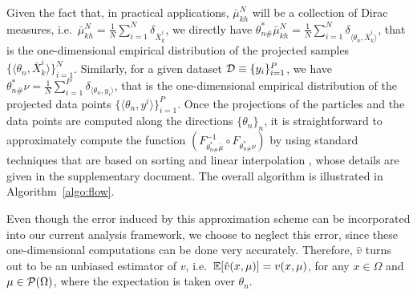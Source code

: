 Given the fact that, in practical applications, $\bar{\mu}^N_{kh}$ will be a collection of Dirac measures, i.e.\ $\bar{\mu}^N_{kh} = \frac1{N} \sum_{i=1}^N \delta_{\bar{X}_{k}^i}$, we directly have $\theta^*_{n\#}\bar{\mu}^N_{kh} = \frac1{N} \sum_{i=1}^N \delta_{\langle \theta_n, \bar{X}_{k}^i \rangle} $, that is the one-dimensional empirical distribution of the projected samples $\{\langle \theta_n, \bar{X}_{k}^i \rangle\}_{i=1}^N$. Similarly, for a given dataset ${\cal D} \equiv \{y_i\}_{i=1}^P$, we have $\theta^*_{n\#}\nu = \frac1{N} \sum_{i=1}^P \delta_{\langle \theta_n, y_i \rangle} $, that is the one-dimensional empirical distribution of the projected data points $\{\langle \theta_n, y^i \rangle\}_{i=1}^P$.  Once the projections of the particles and the data points are computed along the directions $\{\theta_n\}_n$, it is straightforward to approximately compute the function $(F_{\theta^*_{n\#}\bar{\mu}}^{-1} \circ F_{\theta^*_{n\#}\nu}) $ by using standard techniques that are based on sorting and linear interpolation , whose details are given in the supplementary document. The overall algorithm is illustrated in Algorithm~\ref{algo:flow}.


Even though the error induced by this approximation scheme can be incorporated into our current analysis framework, we choose to neglect this error, since these one-dimensional computations can be done very accurately. Therefore, $\hat{v}$ turns out to be an unbiased estimator of $v$, i.e.\ $\mathbb{E}[\hat{v}(x,\mu)] = v(x,\mu)$, for any $x\in \Omega$ and $\mu \in {\cal P}(\Omega)$, where the expectation is taken over $\theta_n$.












